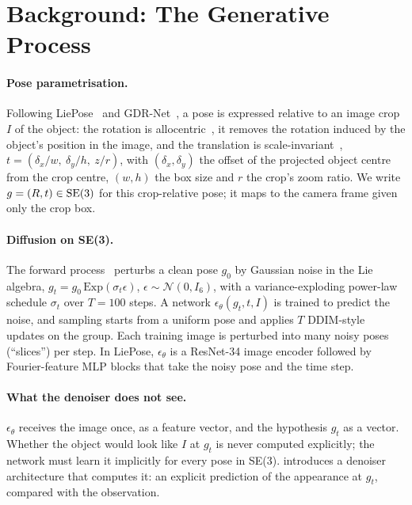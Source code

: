 \section{Background: The Generative Process}
\label{sec:background}

\paragraph{Pose parametrisation.}
Following LiePose~\cite{hsiao2024liepose} and GDR-Net~\cite{wang2021gdrnet}, a pose is expressed relative to an image crop $I$ of the
object: the rotation is allocentric~\cite{kundu2018rcnn3d}, \ie it removes the rotation induced by the object's position in the image,
and the translation is scale-invariant~\cite{li2019cdpn}, $t=(\delta_x/w,\ \delta_y/h,\ z/r)$, with $(\delta_x,\delta_y)$ the offset of
the projected object centre from the crop centre, $(w,h)$ the box size and $r$ the crop's zoom ratio. We write $g=(R,t)\in\mathrm{SE}(3)$ for this
crop-relative pose; it maps to the camera frame given only the crop box.

\paragraph{Diffusion on SE(3).}
The forward process~\cite{hsiao2024liepose} perturbs a clean pose $g_0$ by Gaussian noise in the Lie algebra, $g_t = g_0\,\mathrm{Exp}(\sigma_t\epsilon)$, $\epsilon\sim\mathcal{N}(0,I_6)$, with a variance-exploding
power-law schedule $\sigma_t$ over $T=100$ steps.
A network $\epsilon_\theta(g_t,t,I)$ is trained to predict the noise, and sampling starts from a uniform pose and applies $T$
DDIM-style~\cite{song2021ddim} updates on the group. Each training image is perturbed into many noisy poses (``slices'') per step.
In LiePose, $\epsilon_\theta$ is a ResNet-34 image encoder followed by Fourier-feature MLP blocks that take the noisy pose and the
time step.

\paragraph{What the denoiser does not see.}
$\epsilon_\theta$ receives the image once, as a feature vector, and the hypothesis $g_t$ as a vector. Whether the object would look like
$I$ at $g_t$ is never computed explicitly; the network must learn it implicitly for every pose in SE(3).  introduces
a denoiser architecture that computes it: an explicit prediction of the appearance at $g_t$, compared with the observation.
